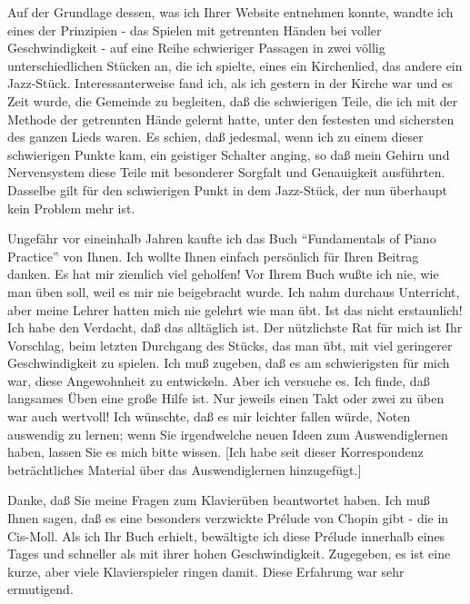 \item \hypertarget{testimonials12}{}
Auf der Grundlage dessen, was ich Ihrer Website entnehmen konnte, wandte ich eines der Prinzipien - das Spielen mit getrennten Händen bei voller Geschwindigkeit - auf eine Reihe schwieriger Passagen in zwei völlig unterschiedlichen Stücken an, die ich spielte, eines ein Kirchenlied, das andere ein Jazz-Stück.
Interessanterweise fand ich, als ich gestern in der Kirche war und es Zeit wurde, die Gemeinde zu begleiten, daß die schwierigen Teile, die ich mit der Methode der getrennten Hände gelernt hatte, unter den festesten und sichersten des ganzen Lieds waren.
Es schien, daß jedesmal, wenn ich zu einem dieser schwierigen Punkte kam, ein geistiger Schalter anging, so daß mein Gehirn und Nervensystem diese Teile mit besonderer Sorgfalt und Genauigkeit ausführten.
Dasselbe gilt für den schwierigen Punkt in dem Jazz-Stück, der nun überhaupt kein Problem mehr ist.


\item \hypertarget{testimonials13}{}
Ungefähr vor eineinhalb Jahren kaufte ich das Buch \enquote{Fundamentals of Piano Practice} von Ihnen.
Ich wollte Ihnen einfach persönlich für Ihren Beitrag danken.
Es hat mir ziemlich viel geholfen!
Vor Ihrem Buch wußte ich nie, wie man üben soll, weil es mir nie beigebracht wurde.
Ich nahm durchaus Unterricht, aber meine Lehrer hatten mich nie gelehrt wie man übt.
Ist das nicht erstaunlich!
Ich habe den Verdacht, daß das alltäglich ist.
Der nützlichste Rat für mich ist Ihr Vorschlag, beim letzten Durchgang des Stücks, das man übt, mit viel geringerer Geschwindigkeit zu spielen.
Ich muß zugeben, daß es am schwierigsten für mich war, diese Angewohnheit zu entwickeln.
Aber ich versuche es.
Ich finde, daß langsames Üben eine große Hilfe ist.
Nur jeweils einen Takt oder zwei zu üben war auch wertvoll!
Ich wünschte, daß es mir leichter fallen würde, Noten auswendig zu lernen; wenn Sie irgendwelche neuen Ideen zum Auswendiglernen haben, lassen Sie es mich bitte wissen.
[Ich habe seit dieser Korrespondenz beträchtliches Material über das Auswendiglernen hinzugefügt.]


\item \hypertarget{testimonials14}{}
Danke, daß Sie meine Fragen zum Klavierüben beantwortet haben.
Ich muß Ihnen sagen, daß es eine besonders verzwickte Prélude von Chopin gibt - die in Cis-Moll.
Als ich Ihr Buch erhielt, bewältigte ich diese Prélude innerhalb eines Tages und schneller als mit ihrer hohen Geschwindigkeit.
Zugegeben, es ist eine kurze, aber viele Klavierspieler ringen damit.
Diese Erfahrung war sehr ermutigend.


